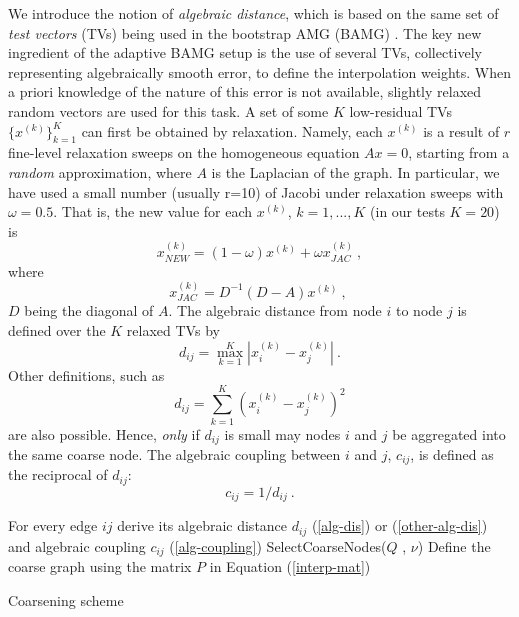 \documentclass[final]{siamltex}
\begin{document}
\par We introduce the notion of {\it algebraic distance}, which is
based on the same set of {\it test vectors} (TVs) being used in the
bootstrap AMG (BAMG) \cite{amg}. The key new ingredient of the
adaptive BAMG setup is the use of several TVs, collectively
representing algebraically smooth error, to define the
interpolation weights. When a priori knowledge of the nature of
this error is not available, slightly relaxed random vectors are
used for this task. A set of some $K$ low-residual TVs
$\{x^{(k)}\}^{K}_{k=1}$ can first be obtained by relaxation.
Namely, each $x^{(k)}$ is a result of $r$ fine-level
relaxation sweeps on the homogeneous equation $Ax=0$, starting
from a {\it random} approximation, where $A$ is the Laplacian of
the graph. In particular, we have used a small number (usually r=10)
of Jacobi under relaxation sweeps with $\omega =0.5$. That is, the
new value for each $x^{(k)}$, $k=1,...,K$ (in our tests $K=20$) is
\begin{equation}\label{sor-iter}
x^{(k)}_{NEW} = (1-\omega)x^{(k)} + \omega x_{JAC}^{(k)}~,
\end{equation}
where
\begin{equation}\label{jacobi-iter}
x_{JAC}^{(k)} = D^{-1}(D-A)x^{(k)} ~,~
\end{equation}
$D$ being the diagonal of $A$. The
algebraic distance from node $i$ to node $j$ is defined over the
$K$ relaxed TVs by
\begin{equation}\label{alg-dis}
d_{ij} = \max_{k=1}^K |x^{(k)}_i - x^{(k)}_j|~.
\end{equation}
Other definitions, such as
\begin{equation}\label{other-alg-dis}
d_{ij} = \sum_{k=1}^K (x^{(k)}_i - x^{(k)}_j)^2
\end{equation}
are also possible.
Hence, {\it only} if $d_{ij}$ is small may nodes $i$ and $j$ be
aggregated into the same coarse node. The algebraic coupling
between $i$ and $j$, $c_{ij}$, is defined as the reciprocal of
$d_{ij}$:
\begin{equation}\label{alg-coupling}
c_{ij} = 1/d_{ij}~.
\end{equation}
\begin{algorithm}
\SetLine {} 

For every edge $ij$ derive its algebraic distance $d_{ij}$
(\ref{alg-dis}) or (\ref{other-alg-dis}) and algebraic coupling $c_{ij}$
(\ref{alg-coupling})\; SelectCoarseNodes($Q$ , $\nu$)\; Define the
coarse graph using the matrix $P$ in Equation (\ref{interp-mat})\;
\caption{Coarsening scheme}\label{alg-gen-coarsening}
\end{algorithm}
\end{document}
